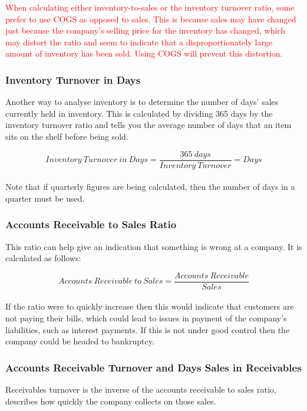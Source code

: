 \documentclass{article}
\begin{document}
\textcolor{red}{When calculating either inventory-to-sales or the inventory turnover ratio, some prefer to use COGS as opposed to sales. This is because sales may have changed just because the company's selling price for the inventory has changed, which may distort the ratio and seem to indicate that a disproportionately large amount of inventory has been sold. Using COGS will prevent this distortion. }

\subsubsection{Inventory Turnover in Days}
Another way to analyse inventory is to determine the number of days' sales currently held in inventory. This is calculated by dividing 365 days by the inventory turnover ratio and tells you the average number of days that an item sits on the shelf before being sold.

\begin{equation}
    Inventory\: Turnover\: in\: Days = \frac{365\: days}{Inventory\: Turnover} = Days
\end{equation}\\

Note that if quarterly figures are being calculated, then the number of days in a quarter must be used. 

\subsubsection{Accounts Receivable to Sales Ratio}
This ratio can help give an indication that something is wrong at a company. It is calculated as follows:

\begin{equation}
    Accounts\: Receivable\: to\: Sales = \frac{Accounts\: Receivable}{Sales} 
\end{equation}\\

If the ratio were to quickly increase then this would indicate that customers are not paying their bills, which could lead to issues in payment of the company's liabilities, such as interest payments. If this is not under good control then the company could be headed to bankruptcy. 

\subsubsection{Accounts Receivable Turnover and Days Sales in Receivables}
Receivables turnover is the inverse of the accounts receivable to sales ratio, describes how quickly the company collects on those sales. 
\end{document}
